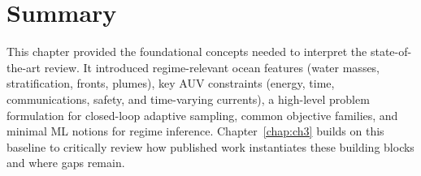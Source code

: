 \section{Summary} \label{sec:ch2_summary}

This chapter provided the foundational concepts needed to interpret the state-of-the-art review.
It introduced regime-relevant ocean features (water masses, stratification, fronts, plumes), key AUV
constraints (energy, time, communications, safety, and time-varying currents), a high-level problem
formulation for closed-loop adaptive sampling, common objective families, and minimal ML notions
for regime inference. Chapter~\ref{chap:ch3} builds on this baseline to critically review how published
work instantiates these building blocks and where gaps remain.

